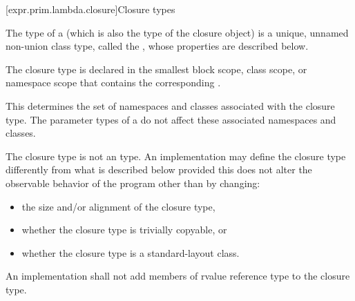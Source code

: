 [expr.prim.lambda.closure]{Closure types}%

\pnum
The type of a  (which is also the type of the
closure object) is a unique, unnamed non-union class type,
called the ,
whose properties are described below.

\pnum
The closure type is declared in the smallest block
scope, class scope, or namespace scope that contains the corresponding
.
\begin{note}
This determines the set of namespaces and
classes associated with the closure type. The parameter
types of a  do not affect these associated namespaces and
classes.
\end{note}
The closure type is not an  type.
An implementation may define the closure type differently from what
is described below provided this does not alter the observable behavior of the program
other than by changing:
\begin{itemize}
\item the size and/or alignment of the closure type,

\item whether the closure type is trivially copyable, or

\item whether the closure type is a standard-layout class.
\end{itemize}

An implementation shall not add members of rvalue reference type to the closure
type.

